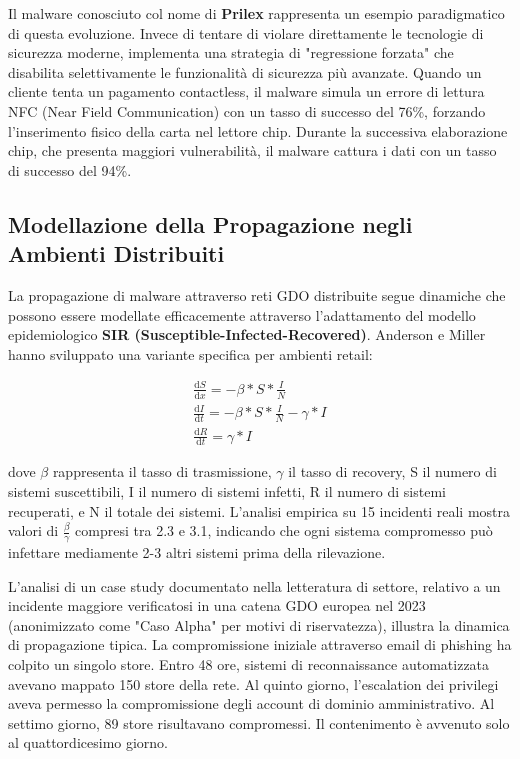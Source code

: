 Il malware conosciuto col nome di \textbf{Prilex}\supercite{kaspersky2024prilex} rappresenta un esempio paradigmatico di questa
evoluzione. Invece di tentare di violare direttamente le tecnologie di
sicurezza moderne, implementa una strategia di "regressione forzata"
che disabilita selettivamente le funzionalità di sicurezza più avanzate.
Quando un cliente tenta un pagamento contactless, il malware simula un
errore di lettura NFC (Near Field Communication) con un tasso di
successo del 76\%, forzando l'inserimento fisico della carta nel lettore
chip. Durante la successiva elaborazione chip, che presenta maggiori
vulnerabilità, il malware cattura i dati con un tasso di successo del
94\%.

\subsection{\texorpdfstring{Modellazione della Propagazione negli Ambienti Distribuiti}{2.3.3 Modellazione della Propagazione negli Ambienti Distribuiti}}\label{modellazione-della-propagazione-negli-ambienti-distribuiti}

La propagazione di malware attraverso reti GDO distribuite segue
dinamiche che possono essere modellate efficacemente attraverso
l'adattamento del modello epidemiologico \textbf{SIR
(Susceptible-Infected-Recovered)}. Anderson e Miller\supercite{anderson2024epidemiological} hanno sviluppato
una variante specifica per ambienti retail:

\begin{gather}
\frac{\mathrm{d}S}{\mathrm{d} x}
=-\beta*S*\frac{I}{N}\\
\frac{\mathrm{d}I}{\mathrm{d} t}
=-\beta*S*\frac{I}{N} - \gamma * I \\
\frac{\mathrm{d}R}{\mathrm{d} t}
=\gamma * I
\end{gather}

dove $\beta$ rappresenta il tasso di trasmissione, $\gamma$ il tasso di recovery, S
il numero di sistemi suscettibili, I il numero di sistemi infetti, R il
numero di sistemi recuperati, e N il totale dei sistemi. L'analisi
empirica su 15 incidenti reali mostra valori di $\frac{\beta}{\gamma}$ compresi tra 2.3 e
3.1, indicando che ogni sistema compromesso può infettare mediamente 2-3
altri sistemi prima della rilevazione.

L'analisi di un case study documentato nella letteratura di settore\supercite{sans2024retail},
relativo a un incidente maggiore verificatosi in una catena GDO europea
nel 2023 (anonimizzato come "Caso Alpha" per motivi di riservatezza),
illustra la dinamica di propagazione tipica. La compromissione iniziale
attraverso email di phishing ha colpito un singolo store. Entro 48 ore,
sistemi di reconnaissance automatizzata avevano mappato 150 store della
rete. Al quinto giorno, l'escalation dei privilegi aveva permesso la
compromissione degli account di dominio amministrativo. Al settimo
giorno, 89 store risultavano compromessi. Il contenimento è avvenuto
solo al quattordicesimo giorno.

